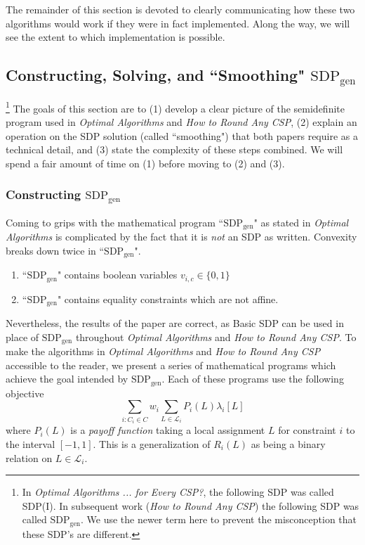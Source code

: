The remainder of this section is devoted to clearly communicating how these two algorithms would work if they were in fact implemented. Along the way, we will see the extent to which implementation is possible.
\subsection{Constructing, Solving, and ``Smoothing" $\text{SDP}_{\text{gen}}$}\footnote{In \textit{Optimal Algorithms ... for Every CSP?}, the following SDP was called SDP(I). In subsequent work (\textit{How to Round Any CSP}) the following SDP was called $\text{SDP}_{\text{gen}}$. We use the newer term here to prevent the misconception that these SDP's are different.
}
The goals of this section are to (1) develop a clear picture of the semidefinite program used in \textit{Optimal Algorithms} and \textit{How to Round Any CSP}, (2) explain an operation on the SDP solution (called ``smoothing") that both papers require as a technical detail, and (3) state the complexity of these steps combined. We will spend a fair amount of time on (1) before moving to (2) and (3).
\subsubsection{Constructing $\text{SDP}_{\text{gen}}$}
Coming to grips with the mathematical program ``$\text{SDP}_{\text{gen}}$" as stated in \textit{Optimal Algorithms} is complicated by the fact that it is \textit{not} an SDP as written. Convexity breaks down twice in ``$\text{SDP}_{\text{gen}}$".
\begin{enumerate}
\item ``$\text{SDP}_{\text{gen}}$" contains boolean variables $v_{i,c} \in \{0,1\}$
\item ``$\text{SDP}_{\text{gen}}$" contains equality constraints which are not affine.
\end{enumerate}
Nevertheless, the results of the paper are correct, as Basic SDP can be used in place of $\text{SDP}_{\text{gen}}$ throughout \textit{Optimal Algorithms} and \textit{How to Round Any CSP}. To make the algorithms in \textit{Optimal Algorithms} and \textit{How to Round Any CSP} accessible to the reader, we present a series of mathematical programs which achieve the goal intended by $\text{SDP}_{\text{gen}}$. Each of these programs use the following objective
\begin{equation}
\sum_{i : C_i \in C} w_i \sum_{L \in \mathcal{L}_i} P_i(L) \lambda_i[L]
\end{equation}
where $P_i(L)$ is a \textit{payoff function} taking a local assignment $L$ for constraint $i$ to the interval $[-1,1]$. This is a generalization of $R_i(L)$ as being a binary relation on $L \in \mathcal{L}_i$.

